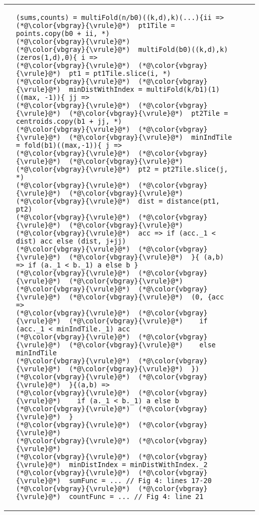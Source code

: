\hspace{-0.105\textwidth}
\centering\begin{tabular}{cm{}m{}m{}}
{} &
{\begin{lstlisting}
(sums,counts) = multiFold(n/b0)((k,d),k)(...){ii =>
(*@\color{vbgray}{\vrule}@*)  pt1Tile = points.copy(b0 + ii, *)
(*@\color{vbgray}{\vrule}@*)
(*@\color{vbgray}{\vrule}@*)  multiFold(b0)((k,d),k)(zeros(1,d),0){ i =>
(*@\color{vbgray}{\vrule}@*)  (*@\color{vbgray}{\vrule}@*)  pt1 = pt1Tile.slice(i, *)
(*@\color{vbgray}{\vrule}@*)  (*@\color{vbgray}{\vrule}@*)  minDistWithIndex = multiFold(k/b1)(1)((max, -1)){ jj =>
(*@\color{vbgray}{\vrule}@*)  (*@\color{vbgray}{\vrule}@*)  (*@\color{vbgray}{\vrule}@*)  pt2Tile = centroids.copy(b1 + jj, *)
(*@\color{vbgray}{\vrule}@*)  (*@\color{vbgray}{\vrule}@*)  (*@\color{vbgray}{\vrule}@*)  minIndTile = fold(b1)((max,-1)){ j =>
(*@\color{vbgray}{\vrule}@*)  (*@\color{vbgray}{\vrule}@*)  (*@\color{vbgray}{\vrule}@*)  (*@\color{vbgray}{\vrule}@*)  pt2 = pt2Tile.slice(j, *)
(*@\color{vbgray}{\vrule}@*)  (*@\color{vbgray}{\vrule}@*)  (*@\color{vbgray}{\vrule}@*)  (*@\color{vbgray}{\vrule}@*)  dist = distance(pt1, pt2)
(*@\color{vbgray}{\vrule}@*)  (*@\color{vbgray}{\vrule}@*)  (*@\color{vbgray}{\vrule}@*)  (*@\color{vbgray}{\vrule}@*)  acc => if (acc._1 < dist) acc else (dist, j+jj)
(*@\color{vbgray}{\vrule}@*)  (*@\color{vbgray}{\vrule}@*)  (*@\color{vbgray}{\vrule}@*)  }{ (a,b) => if (a._1 < b._1) a else b }
(*@\color{vbgray}{\vrule}@*)  (*@\color{vbgray}{\vrule}@*)  (*@\color{vbgray}{\vrule}@*)
(*@\color{vbgray}{\vrule}@*)  (*@\color{vbgray}{\vrule}@*)  (*@\color{vbgray}{\vrule}@*)  (0, {acc =>
(*@\color{vbgray}{\vrule}@*)  (*@\color{vbgray}{\vrule}@*)  (*@\color{vbgray}{\vrule}@*)    if (acc._1 < minIndTile._1) acc
(*@\color{vbgray}{\vrule}@*)  (*@\color{vbgray}{\vrule}@*)  (*@\color{vbgray}{\vrule}@*)    else minIndTile
(*@\color{vbgray}{\vrule}@*)  (*@\color{vbgray}{\vrule}@*)  (*@\color{vbgray}{\vrule}@*)  })
(*@\color{vbgray}{\vrule}@*)  (*@\color{vbgray}{\vrule}@*)  }{(a,b) =>
(*@\color{vbgray}{\vrule}@*)  (*@\color{vbgray}{\vrule}@*)    if (a._1 < b._1) a else b
(*@\color{vbgray}{\vrule}@*)  (*@\color{vbgray}{\vrule}@*)  }
(*@\color{vbgray}{\vrule}@*)  (*@\color{vbgray}{\vrule}@*)
(*@\color{vbgray}{\vrule}@*)  (*@\color{vbgray}{\vrule}@*)
(*@\color{vbgray}{\vrule}@*)  (*@\color{vbgray}{\vrule}@*)  minDistIndex = minDistWithIndex._2
(*@\color{vbgray}{\vrule}@*)  (*@\color{vbgray}{\vrule}@*)  sumFunc = ... // Fig 4: lines 17-20
(*@\color{vbgray}{\vrule}@*)  (*@\color{vbgray}{\vrule}@*)  countFunc = ... // Fig 4: line 21

\end{lstlisting}}
\end{tabular}
